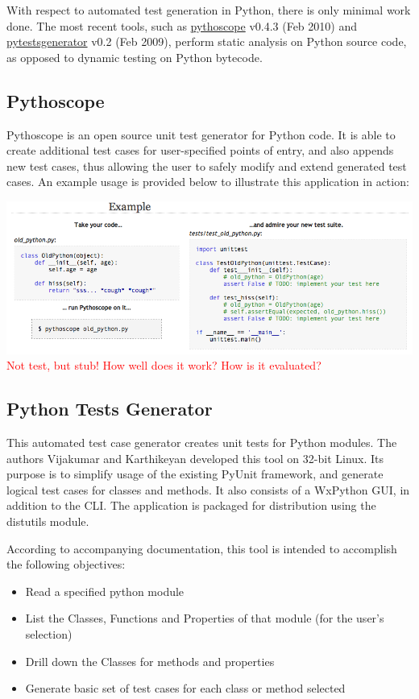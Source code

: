 \documentclass{icldt}
\numberwithin{equation}{section}       %
\begin{document}
With respect to automated test generation in Python, there is only minimal work done. The most recent tools, such as \href{http://pythoscope.org/tutorial}{\textsf{pythoscope}} v0.4.3 (Feb 2010) and \href{http://code.google.com/p/pytestsgenerator}{\textsf{pytestsgenerator}} v0.2 (Feb 2009), perform static analysis on Python source code, as opposed to dynamic testing on Python bytecode.

\subsection{Pythoscope}
Pythoscope is an open source unit test generator for Python code. It is able to create additional test cases for user-specified points of entry, and also appends new test cases, thus allowing the user to safely modify and extend generated test cases. An example usage is provided below to illustrate this application in action:

\includegraphics[scale=.46]{pythoscope.png}
\textcolor{red}{Not test, but stub! How well does it work? How is it evaluated?}
\subsection{Python Tests Generator}
This automated test case generator creates unit tests for Python modules. The authors Vijakumar and Karthikeyan developed this tool on 32-bit Linux. Its purpose is to simplify usage of the existing PyUnit framework, and generate logical test cases for classes and methods. It also consists of a WxPython GUI, in addition to the CLI. The application is packaged for distribution using the \textsf{distutils} module.

According to accompanying documentation, this tool is intended to accomplish the following objectives:
\begin{itemize}
	\item Read a specified python module
	\item List the Classes, Functions and Properties of that module (for the user's selection)
	\item Drill down the Classes for methods and properties
	\item Generate basic set of test cases for each class or method selected
\end{itemize}
\end{document}
